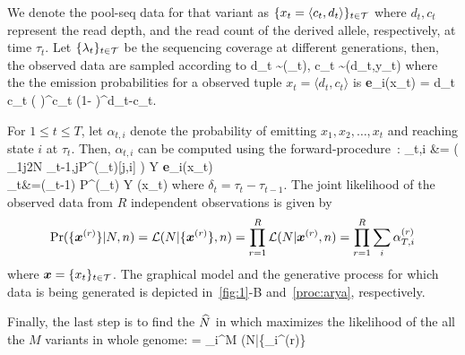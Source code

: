 We denote the pool-seq data for that variant as $\{x_t =
\langle c_t,d_t \rangle\}_{t\in{\cal T}}$ where $d_t, c_t$ represent the read depth,
and the read count of the derived allele, respectively, at time
$\tau_t$. Let $\{\lambda_t\}_{t\in{\cal T}}$ be the sequencing coverage at different 
generations, then, the observed data are sampled according to 
\beq
d_t \sim \poiss(\lambda_t), \hspace{1in} c_t \sim \bino(d_t,y_t)
\eeq
where the the emission probabilities for a observed tuple  $x_t=\langle d_t, 
c_t\rangle $ is
\beq
	{\bf e}_{i}(x_t) = {d_t \choose c_t} \left( \right)^{c_t}\left 
	(1- 
	 \right)^{d_t-c_t}.
\eeq
{}


For $1\le t\le T$, let $\alpha_{t,i}$ denote the probability of
emitting $x_1,x_2,\ldots,x_t$ and reaching state $i$ at
$\tau_t$. Then, $\alpha_{t,i}$ can be computed using the
forward-procedure~\cite{durbin1998biological}:
\beq
	\alpha_{t,i} &= \left( \sum_{1\le j\le 2N} 
	\alpha_{t-1,j}\;P^{(\delta_t)}[j,i] \right) Y {\bf 
	e}_{i}(x_t)\;\; \\
	\alpha_t&=(\alpha_{t-1}) P^{(\delta_t)} Y \bfe(x_t)
	\label{eq:hmm}
\eeq
where $\delta_t=\tau_t-\tau_{t-1}$. The joint likelihood of the
observed data from $R$ independent observations is given by
\begin{equation}
\operatorname{Pr}(\{\bm{x}^{(r)}\}|N,n) =	{\cal L}(N|\{\bm{x}^{(r)}\}, 
n)=\prod_{r=1}^R{\cal L}(N|\bm{x}^{(r)},n)
	 = 
	\prod_{r=1}^R \sum_i\alpha_{T,i}^{(r)}
	\label{eq:hmmlik}
\end{equation}
where $\bm{x}=\{x_t\}_{t\in {\cal T}}$. The graphical model and the generative 
process for which data is being generated is depicted in~\ref{fig:1}-B 
and~\ref{proc:arya}, respectively.

Finally, the last step is to find the  $\widehat{N}$ in which maximizes the likelihood of 
the all the $M$ variants in whole genome:
\beq
\hN =  \prod_i^M \Lc(N|\{_i^{(r)}\} 
\label{eq:mlen}
\eeq

